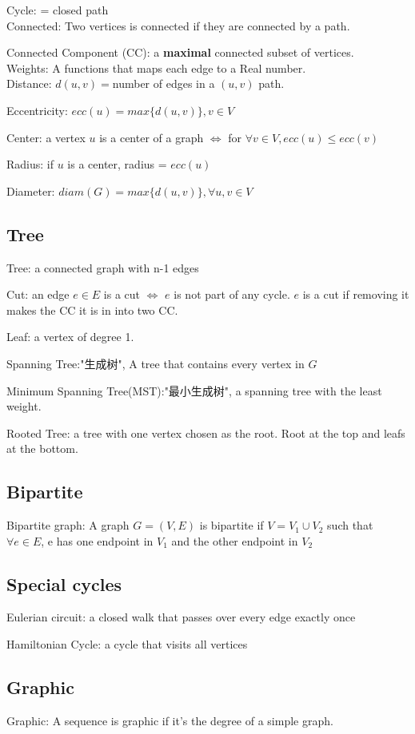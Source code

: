 \documentclass[12pt,a4paper]{ctexrep}
\begin{document}
Cycle: = closed path\\

Connected: Two vertices is connected if they are connected by a path.

Connected Component (CC): a \textbf{maximal} connected subset of vertices.\\

Weights: A functions that maps each edge to a Real number.\\

Distance: $d(u,v) = $number of edges in a $(u,v)$ path.

Eccentricity: $ecc(u) = max\{d(u,v)\},v \in V$

Center: a vertex $u$ is a center of a graph $\iff$ for $\forall v \in V, ecc(u) \leq ecc(v)$

Radius: if $u$ is a center, radius = $ecc(u)$

Diameter: $diam(G) = max\{d(u,v)\},\forall u,v \in V$
\subsection{Tree}
Tree: a connected graph with n-1 edges

Cut: an edge $e \in E$ is a cut $\iff$ $e$ is not part of any cycle. $e$ is a cut if removing it makes the CC it is in into two CC. 

Leaf: a vertex of degree 1.

Spanning Tree:"生成树", A tree that contains every vertex in $G$

Minimum Spanning Tree(MST):"最小生成树", a spanning tree with the least weight.

Rooted Tree: a tree with one vertex chosen as the root. Root at the top and leafs at the bottom.
\subsection{Bipartite}
Bipartite graph: A graph $G=(V,E)$ is bipartite if $V = V_{1}\cup V_{2}$ such that $\forall e \in E$, e has one endpoint in $V_{1}$ and the other endpoint in $V_{2}$
\subsection{Special cycles}
Eulerian circuit: a closed walk that passes over every edge exactly once

Hamiltonian Cycle: a cycle that visits all vertices
\subsection{Graphic}
Graphic: A sequence is graphic if it's the degree of a simple graph.
\end{document}
